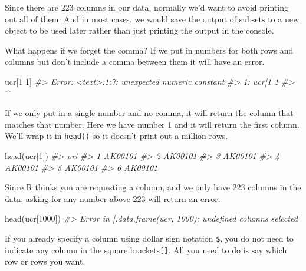 \documentclass[
]{krantz}
\makeatletter
\newenvironment{Shaded}{\begin{snugshade}}{\end{snugshade}}
\newcommand{\CommentTok}[1]{\textcolor[rgb]{0.37,0.37,0.37}{\textit{#1}}}
\newcommand{\DecValTok}[1]{\textcolor[rgb]{0.06,0.06,0.06}{#1}}
\newcommand{\FunctionTok}[1]{\textcolor[rgb]{0,0,0}{#1}}
\newcommand{\NormalTok}[1]{#1}
\newenvironment{kframe}{%
\medskip{}
\setlength{\fboxsep}{.8em}
 \def\at@end@of@kframe{}%
 \ifinner\ifhmode%
  \def\at@end@of@kframe{\end{minipage}}%
  \begin{minipage}{\columnwidth}%
 \fi\fi%
 \def\FrameCommand##1{\hskip\@totalleftmargin \hskip-\fboxsep
 \colorbox{shadecolor}{##1}\hskip-\fboxsep
     \hskip-\linewidth \hskip-\@totalleftmargin \hskip\columnwidth}%
 \MakeFramed {\advance\hsize-\width
   \@totalleftmargin\z@ \linewidth\hsize
   \@setminipage}}%
 {\par\unskip\endMakeFramed%
 \at@end@of@kframe}
\renewenvironment{Shaded}{\begin{kframe}}{\end{kframe}}
\makeatother
\begin{document}
Since there are 223 columns in our data, normally we'd want
to avoid printing out all of them. And in most cases, we
would save the output of subsets to a new object to be used
later rather than just printing the output in the console.

What happens if we forget the comma? If we put in numbers
for both rows and columns but don't include a comma between
them it will have an error.

\begin{Shaded}
\begin{Highlighting}[]
\NormalTok{ucr[}\DecValTok{1} \DecValTok{1}\NormalTok{]}
\CommentTok{\#\textgreater{} Error: \textless{}text\textgreater{}:1:7: unexpected numeric constant}
\CommentTok{\#\textgreater{} 1: ucr[1 1}
\CommentTok{\#\textgreater{}           \^{}}
\end{Highlighting}
\end{Shaded}

If we only put in a single number and no comma, it will
return the column that matches that number. Here we have
number 1 and it will return the first column. We'll wrap it
in \texttt{head()} so it doesn't print out a million rows.

\begin{Shaded}
\begin{Highlighting}[]
\FunctionTok{head}\NormalTok{(ucr[}\DecValTok{1}\NormalTok{])}
\CommentTok{\#\textgreater{}       ori}
\CommentTok{\#\textgreater{} 1 AK00101}
\CommentTok{\#\textgreater{} 2 AK00101}
\CommentTok{\#\textgreater{} 3 AK00101}
\CommentTok{\#\textgreater{} 4 AK00101}
\CommentTok{\#\textgreater{} 5 AK00101}
\CommentTok{\#\textgreater{} 6 AK00101}
\end{Highlighting}
\end{Shaded}

Since R thinks you are requesting a column, and we only have
223 columns in the data, asking for any number above 223
will return an error.

\begin{Shaded}
\begin{Highlighting}[]
\FunctionTok{head}\NormalTok{(ucr[}\DecValTok{1000}\NormalTok{])}
\CommentTok{\#\textgreater{} Error in \textasciigrave{}[.data.frame\textasciigrave{}(ucr, 1000): undefined columns selected}
\end{Highlighting}
\end{Shaded}

If you already specify a column using dollar sign notation
\texttt{\$}, you do not need to indicate any column in the
square brackets\texttt{{[}{]}}. All you need to do is say
which row or rows you want.
\end{document}
